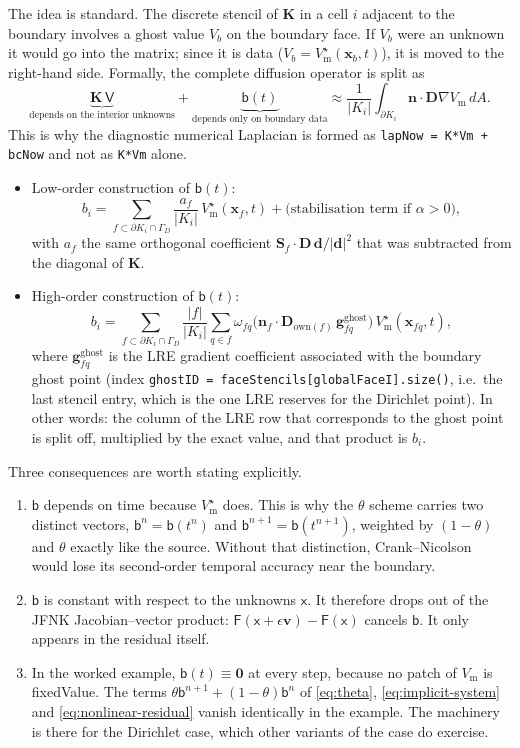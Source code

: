 \documentclass[11pt,a4paper]{article}
\newcommand{\code}[1]{\texttt{\small #1}}
\newcommand{\Vm}{V_{\text{m}}}
\newcommand{\Dten}{\mathbf{D}}
\newcommand{\grad}{\nabla}
\newcommand{\Kstif}{\mathbf{K}}
\newcommand{\Fres}{\mathsf{F}}
\begin{document}
The idea is standard. The discrete stencil of $\Kstif$ in a cell $i$ adjacent to
the boundary involves a ghost value $V_b$ on the boundary face. If $V_b$ were an
unknown it would go into the matrix; since it is data
($V_b=\Vm^\star(\mathbf{x}_b,t)$), it is moved to the right-hand side. Formally,
the complete diffusion operator is split as
$$
\underbrace{\Kstif\,\mathsf{V}}_{\text{depends on the interior unknowns}} +\underbrace{\mathsf{b}(t)}_{\text{depends only on boundary data}} \approx \frac{1}{|K_i|}\int_{\partial K_i}\mathbf{n}\cdot\Dten\grad\Vm\,dA .
$$
This is why the diagnostic numerical Laplacian is formed as
\code{lapNow = K*Vm + bcNow} and not as \code{K*Vm} alone.

\begin{itemize}
\item Low-order construction of $\mathsf{b}(t)$:
$$
b_i = \sum_{f\subset\partial K_i\cap\Gamma_D}\frac{a_f}{|K_i|}\,\Vm^\star(\mathbf{x}_f,t)+\text{(stabilisation term if }\alpha>0),
$$
with $a_f$ the same orthogonal coefficient
$\mathbf{S}_f\!\cdot\!\Dten\,\mathbf{d}/|\mathbf{d}|^2$ that was subtracted from
the diagonal of $\Kstif$.
\item High-order construction of $\mathsf{b}(t)$:
$$
b_i = \sum_{f\subset\partial K_i\cap\Gamma_D}\frac{|f|}{|K_i|}\sum_{q\in f}\omega_{fq}\Big(\mathbf{n}_f\cdot\Dten_{\mathrm{own}(f)}\,\mathbf{g}^{\text{ghost}}_{fq}\Big)\,\Vm^\star(\mathbf{x}_{fq},t),
$$
where $\mathbf{g}^{\text{ghost}}_{fq}$ is the LRE gradient coefficient
associated with the boundary ghost point (index
\code{ghostID = faceStencils[globalFaceI].size()}, i.e.\ the last stencil entry,
which is the one LRE reserves for the Dirichlet point). In other words: the
column of the LRE row that corresponds to the ghost point is split off,
multiplied by the exact value, and that product is $b_i$.
\end{itemize}

Three consequences are worth stating explicitly.
\begin{enumerate}
\item $\mathsf{b}$ depends on time because $\Vm^\star$ does. This is why the
$\theta$ scheme carries two distinct vectors, $\mathsf{b}^n=\mathsf{b}(t^n)$ and
$\mathsf{b}^{n+1}=\mathsf{b}(t^{n+1})$, weighted by $(1-\theta)$ and $\theta$
exactly like the source. Without that distinction, Crank--Nicolson would lose
its second-order temporal accuracy near the boundary.
\item $\mathsf{b}$ is constant with respect to the unknowns $\mathsf{x}$. It
therefore drops out of the JFNK Jacobian--vector product:
$\Fres(\mathsf{x}+\epsilon\mathbf{v})-\Fres(\mathsf{x})$ cancels $\mathsf{b}$.
It only appears in the residual itself.
\item In the worked example, $\mathsf{b}(t)\equiv\mathbf{0}$ at every step, because no patch of $V_\text{m}$ is fixedValue. The terms $\theta\mathsf{b}^{n+1}+(1-\theta)\mathsf{b}^{n}$ of \eqref{eq:theta}, \eqref{eq:implicit-system} and \eqref{eq:nonlinear-residual} vanish identically in the example. The machinery is there for the Dirichlet case, which other variants of the case do exercise.
\end{enumerate}
\end{document}
